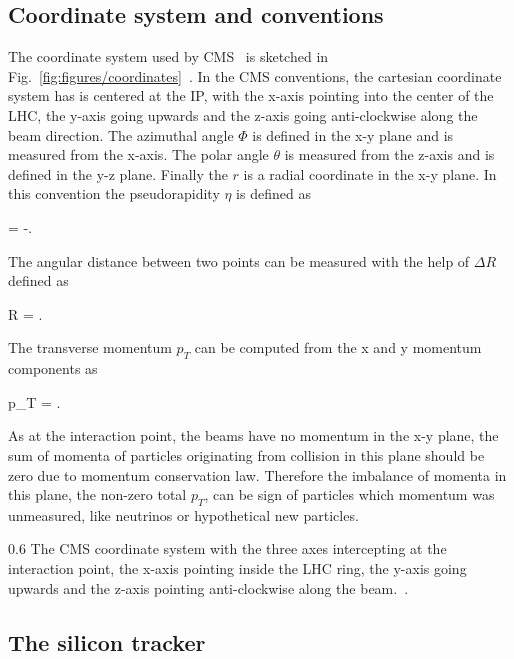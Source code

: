 \subsection{Coordinate system and conventions}


The coordinate system used by CMS~\cite{Chatrchyan:2008zzk} is sketched in Fig.~\ref{fig:figures/coordinates}~\cite{Pantaleo:2293435}. In the CMS conventions, the cartesian coordinate system has is centered at the IP, with the x-axis pointing into the center of the LHC, the y-axis going upwards and the z-axis going anti-clockwise along the beam direction. The azimuthal angle $\Phi$ is defined in the x-y plane and is measured from the x-axis. The polar angle $\theta$ is measured from the z-axis and is defined in the y-z plane. Finally the $r$ is a radial coordinate in the x-y plane. In this convention the pseudorapidity $\eta$ is defined as

{
    \eta =  -\ln {}.
}

The angular distance between two points can be measured with the help of $\Delta R$ defined as

{
    \Delta R = .
}


The transverse momentum $p_{T}$ can be computed from the x and y momentum components as

{
    p_{T} =  .
}

As at the interaction point, the beams have no momentum in the x-y plane, the sum of momenta of particles originating from collision in this plane should be zero due to momentum conservation law. Therefore the imbalance of momenta in this plane, the non-zero total $p_{T}$, can be sign of particles which momentum was unmeasured, like neutrinos or hypothetical new particles. 

                 {0.6}       %
                 { The CMS coordinate system with the three axes intercepting at the interaction point, the x-axis pointing inside the LHC ring, the y-axis going upwards and the z-axis pointing anti-clockwise along the beam.~\cite{Pantaleo:2293435}. }

\subsection{The silicon tracker~\label{sec:tracker}}

